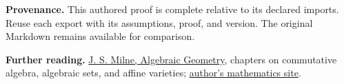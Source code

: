 \documentclass[preprint,12pt,aps,pra,showkeys,amsmath,amssymb,superscriptaddress,floatfix]{revtex4-2}
\theoremstyle{definition}
\theoremstyle{remark}
\begin{document}
\par\medskip\begingroup\small\linespread{1.0}\selectfont\noindent\textbf{Provenance.} This authored proof is complete relative to its declared imports. Reuse
each export with its assumptions, proof, and version. The original
Markdown remains available for comparison.
\par\endgroup

\par\smallskip\begingroup\small\linespread{1.0}\selectfont\noindent\textbf{Further reading.} \href{https://www.jmilne.org/math/CourseNotes/ag.html}{J. S. Milne,
Algebraic Geometry}, chapters on commutative algebra, algebraic sets,
and affine varieties; \href{https://www.jmilne.org/math/}{author's
mathematics site}.\par\endgroup
\end{document}

